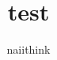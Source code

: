 \documentclass{naiithink}
\title{test}
\author{naiithink}
\begin{document}
\begin{titlepage}
\maketitle
\end{titlepage}
\end{document}
